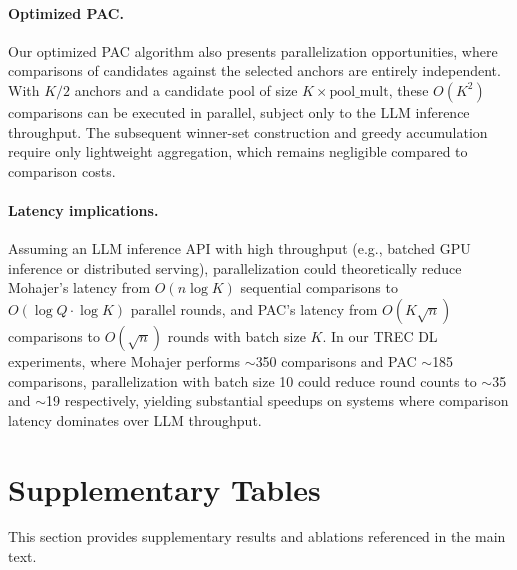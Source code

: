 \documentclass{llmxive}
\providecommand{\arraystretch}{1.00}
\providecommand{\topfraction}{0.95}
\providecommand{\bottomfraction}{0.95}
\providecommand{\textfraction}{0.05}
\providecommand{\floatpagefraction}{0.95}
\begin{document}
\paragraph{Optimized PAC.}
Our optimized PAC algorithm also presents parallelization opportunities, where comparisons of candidates against the selected anchors are entirely independent.
With $K/2$ anchors and a candidate pool of size $K \times \text{pool\_mult}$, these $O(K^2)$ comparisons can be executed in parallel, subject only to the LLM inference throughput.
The subsequent winner-set construction and greedy accumulation require only lightweight aggregation, which remains negligible compared to comparison costs.

\paragraph{Latency implications.}
Assuming an LLM inference API with high throughput (e.g., batched GPU inference or distributed serving), parallelization could theoretically reduce Mohajer's latency from $O(n \log K)$ sequential comparisons to $O(\log Q \cdot \log K)$ parallel rounds, and PAC's latency from $O(K \sqrt{n})$ comparisons to $O(\sqrt{n})$ rounds with batch size $K$.
In our TREC DL experiments, where Mohajer performs $\sim$350 comparisons and PAC $\sim$185 comparisons, parallelization with batch size 10 could reduce round counts to $\sim$35 and $\sim$19 respectively, yielding substantial speedups on systems where comparison latency dominates over LLM throughput.


\section{Supplementary Tables}
\label{sec:appendix}
\FloatBarrier

\FloatBarrier

\noindent This section provides supplementary results and ablations referenced in the main text.
\vspace{0.5em}

\begingroup

\setcounter{topnumber}{5}
\setcounter{bottomnumber}{5}
\setcounter{totalnumber}{10}
\renewcommand{\topfraction}{0.95}
\renewcommand{\bottomfraction}{0.95}
\renewcommand{\textfraction}{0.05}
\renewcommand{\floatpagefraction}{0.95}

\setlength{\textfloatsep}{10pt plus 2pt minus 2pt}
\setlength{\floatsep}{8pt plus 2pt minus 2pt}
\setlength{\intextsep}{8pt plus 2pt minus 2pt}
\renewcommand{\arraystretch}{1.08}
\setlength{\tabcolsep}{3.5pt}
\end{document}
